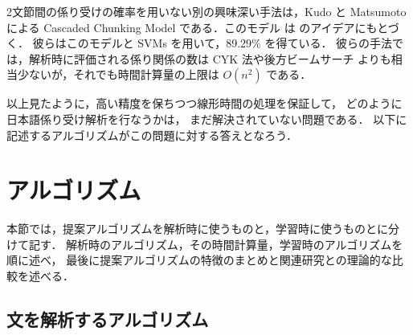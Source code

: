 \documentclass[japanese]{jnlp_1.2c}
\begin{document}
2文節間の係り受けの確率を用いない別の興味深い手法は，Kudo と Matsumoto  による 
Cascaded Chunking Model である．このモデル
は \cite{Abney1991,Ratnaparkhi1997} のアイデアにもとづく．
彼らはこのモデルと SVMs を用いて，89.29\% を得ている．
彼らの手法では，解析時に評価される係り関係の数は CYK 法や後方ビームサーチ
よりも相当少ないが，それでも時間計算量の上限は $O(n^2)$ である．

以上見たように，高い精度を保ちつつ線形時間の処理を保証して，
どのように日本語係り受け解析を行なうかは，
まだ解決されていない問題である．
以下に記述するアルゴリズムがこの問題に対する答えとなろう．


\section{アルゴリズム}\label{sec:algo}
本節では，提案アルゴリズムを解析時に使うものと，学習時に使うものとに分
けて記す．
解析時のアルゴリズム，その時間計算量，学習時のアルゴリズムを
順に述べ，
最後に提案アルゴリズムの特徴のまとめと関連研究との理論的な比較を述べる．

\subsection{文を解析するアルゴリズム}
\end{document}
